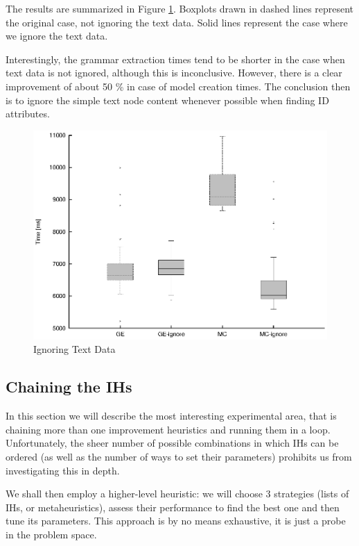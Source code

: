 The results are summarized in Figure \ref{image-experiment-ignore-text-data}. Boxplots drawn in dashed lines represent the original case, not ignoring the text data. Solid lines represent the case where we ignore the text data.

Interestingly, the grammar extraction times tend to be shorter in the case when text data is not ignored, although this is inconclusive. However, there is a clear improvement of about 50 \% in case of model creation times. The conclusion then is to ignore the simple text node content whenever possible when finding ID attributes.

\begin{figure}
  \caption{Ignoring Text Data}
  \label{image-experiment-ignore-text-data}
  \centering
    \includegraphics[width=\textwidth]{images/experiments/ignore-text-data}
\end{figure}

\subsection{Chaining the IHs}


In this section we will describe the most interesting experimental area, that is chaining more than one improvement heuristics and running them in a loop. Unfortunately, the sheer number of possible combinations in which IHs can be ordered (as well as the number of ways to set their parameters) prohibits us from investigating this in depth.

We shall then employ a higher-level heuristic: we will choose 3 strategies (lists of IHs, or metaheuristics), assess their performance to find the best one and then tune its parameters. This approach is by no means exhaustive, it is just a probe in the problem space.

